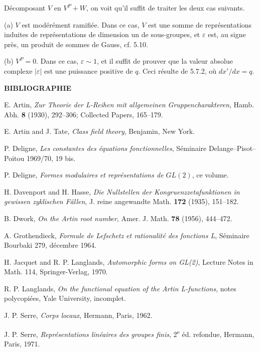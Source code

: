 \documentclass[10pt]{article}
\begin{document}
Décomposant \(V\) en \(V^P+W\), on voit qu'il suffit de traiter les deux cas suivants.

(a) \(V\) est modérément ramifiée. Dans ce cas, \(V\) est une somme de représentations induites de représentations de dimension un de sous-groupes, et \(\varepsilon\) est, au signe près, un produit de sommes de Gauss, cf. 5.10.

(b) \(V^P=0\). Dans ce cas, \(\varepsilon\sim1\), et il suffit de prouver que la valeur absolue complexe \(|\varepsilon|\) est une puissance positive de \(q\). Ceci résulte de 5.7.2, où \(dx'/dx=q\).

\begin{center}
\bfseries BIBLIOGRAPHIE
\end{center}

\begin{enumerate}[label={[\arabic*]},leftmargin=2.8em]
\item E. Artin, \emph{Zur Theorie der L-Reihen mit allgemeinen Gruppencharakteren}, Hamb. Abh. \textbf{8} (1930), 292--306; Collected Papers, 165--179.
\item E. Artin and J. Tate, \emph{Class field theory}, Benjamin, New York.
\item P. Deligne, \emph{Les constantes des équations fonctionnelles}, Séminaire Delange--Pisot--Poitou 1969/70, 19 bis.
\item P. Deligne, \emph{Formes modulaires et représentations de \(GL(2)\)}, ce volume.
\item H. Davenport and H. Hasse, \emph{Die Nullstellen der Kongruenzzetafunktionen in gewissen zyklischen Fällen}, J. reine angewandte Math. \textbf{172} (1935), 151--182.
\item B. Dwork, \emph{On the Artin root number}, Amer. J. Math. \textbf{78} (1956), 444--472.
\item A. Grothendieck, \emph{Formule de Lefschetz et rationalité des fonctions L}, Séminaire Bourbaki 279, décembre 1964.
\item H. Jacquet and R. P. Langlands, \emph{Automorphic forms on GL(2)}, Lecture Notes in Math. 114, Springer-Verlag, 1970.
\item R. P. Langlands, \emph{On the functional equation of the Artin L-functions}, notes polycopiées, Yale University, incomplet.
\item J. P. Serre, \emph{Corps locaux}, Hermann, Paris, 1962.
\item J. P. Serre, \emph{Représentations linéaires des groupes finis}, 2\textsuperscript{e} éd. refondue, Hermann, Paris, 1971.

\end{enumerate}
\end{document}
